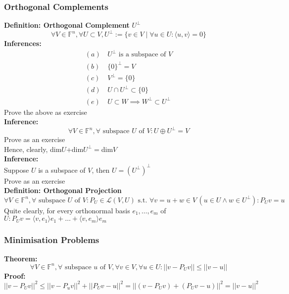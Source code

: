 \documentclass{article}
\newcommand{\F}{\mathbb{F}}
\newcommand{\st}{\mbox{ s.t. }}
\newcommand{\0}{{\bf{0}}}
\begin{document}
\subsubsection{Orthogonal Complements}
\textbf{Definition: Orthogonal Complement} $U^\perp$
$$\forall V\in\F^n,\forall U\subset V,U^\perp:=\{v\in V\mid\forall u\in U:\langle u,v\rangle=0\}$$
\textbf{Inferences:}
\begin{equation}
\begin{split}
    (a)\,&U^\perp\mbox{ is a subspace of }V\\
    (b)\,&\{0\}^\perp=V\\
    (c)\,&V^\perp=\{0\}\\
    (d)\,&U\cap U^\perp\subset\{0\}\\
    (e)\,&U\subset W\implies W^\perp\subset U^\perp
\end{split}
\end{equation}
\null\hfill{Prove the above as exercise}\\
\textbf{Inference:}
$$\forall V\in\F^n,\forall\mbox{ subspace $U$ of $V$}:U\oplus U^\perp=V$$
\null\hfill{Prove as an exercise}\\
Hence, clearly, dim$U$+dim$U^\perp= $dim$V$\\
\textbf{Inference:}\\
Suppose $U$ is a subspace of $V$, then $U=(U^\perp)^\perp$\\
\null\hfill{Prove as an exercise}\\
\textbf{Definition: Orthogonal Projection}
$$\forall V\in\F^n,\forall\mbox{ subspace $U$ of $V$}:P_U\in\mathcal{L}(V,U)\st\forall v=u+w\in V\,(u\in U\land w\in U^\perp):P_Uv=u$$
Quite clearly, for every orthonormal basis $e_1,\dots,e_m$ of $U:P_Uv=\langle v,e_1\rangle e_1+\dots+\langle v,e_m\rangle e_m$
\subsubsection{Minimisation Problems}
\textbf{Theorem:}
$$\forall V\in\F^n,\forall\mbox{ subspace $u$ of $V$},\forall v\in V,\forall u\in U:||v-P_Uv||\le||v-u||$$
\textbf{Proof:}
$$||v-P_Uv||^2\le||v-P_uv||^2+||P_Uv-u||^2=||(v-P_Uv)+(P_Uv-u)||^2=||v-u||^2$$
\end{document}
